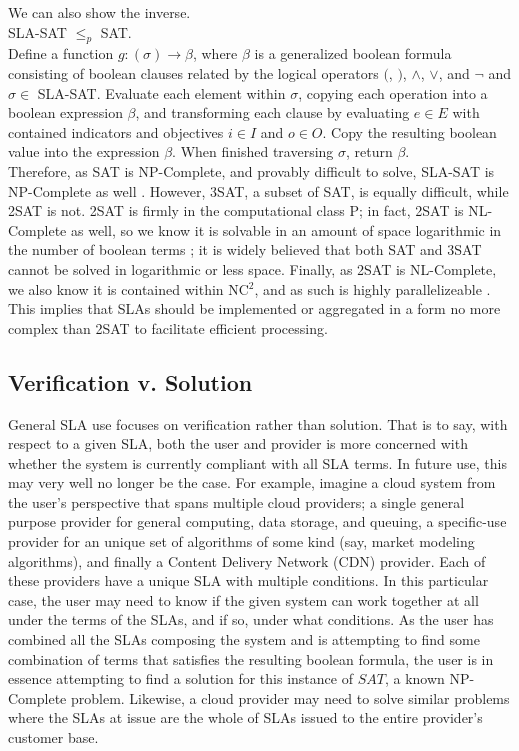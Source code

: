 \noindent We can also show the inverse.\\

 SLA-SAT $ \leq_{p} $ SAT.\\

 Define a function $ g : ( \sigma ) \rightarrow \beta $, where $ \beta $ is a generalized boolean formula consisting of boolean clauses related by the logical operators $($, $)$, $\land$, $\lor$, and $\lnot$ and $ \sigma \in $ SLA-SAT.  Evaluate each element within $\sigma$, copying each operation into a boolean expression $\beta$, and transforming each clause by evaluating $e \in E$ with contained indicators and objectives $i \in I$ and $o \in O$.  Copy the resulting boolean value into the expression $\beta$.  When finished traversing $\sigma$, return $\beta$. \\

Therefore, as SAT is NP-Complete, and provably difficult to solve, SLA-SAT is NP-Complete as well \cite{comptheory:sipser:intro-comp-theory}.  However, 3SAT, a subset of SAT, is equally difficult, while 2SAT is not.  2SAT is firmly in the computational class P; in fact, 2SAT is NL-Complete as well, so we know it is solvable in an amount of space logarithmic in the number of boolean terms \cite{comptheory:papadimitriou:computational-complexity}; it is widely believed that both SAT and 3SAT cannot be solved in logarithmic or less space.  Finally, as 2SAT is NL-Complete, we also know it is contained within NC$^{2}$, and as such is highly parallelizeable \cite{comptheory:papadimitriou:computational-complexity}.  This implies that SLAs should be implemented or aggregated in a form no more complex than 2SAT to facilitate efficient processing.

\subsection{Verification v. Solution}
General SLA use focuses on verification rather than solution.  That is to say, with respect to a given SLA, both the user and provider is more concerned with whether the system is currently compliant with all SLA terms.  In future use, this may very well no longer be the case.  For example, imagine a cloud system from the user's perspective that spans multiple cloud providers; a single general purpose provider for general computing, data storage, and queuing, a specific-use provider for an unique set of algorithms of some kind (say, market modeling algorithms), and finally a Content Delivery Network (CDN) provider.  Each of these providers have a unique SLA with multiple conditions.  In this particular case, the user may need to know if the given system can work together at all under the terms of the SLAs, and if so, under what conditions.  As the user has combined all the SLAs composing the system and is attempting to find some combination of terms that satisfies the resulting boolean formula, the user is in essence attempting to find a solution for this instance of $ SAT $, a known NP-Complete problem.  Likewise, a cloud provider may need to solve similar problems where the SLAs at issue are the whole of SLAs issued to the entire provider's customer base.


